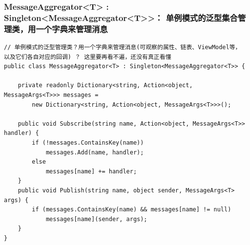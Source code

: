 \documentclass[9pt, b5paper]{article}
\begin{document}
\subsubsection{MessageAggregator<T> : Singleton<MessageAggregator<T>>： 单例模式的泛型集合管理类，用一个字典来管理消息}
\label{sec-6-2-2}
\begin{verbatim}
// 单例模式的泛型管理类？用一个字典来管理消息(可观察的属性、链表、ViewModel等， 以及它们各自对应的回调) ？ 这里要再看不遍，还没有真正看懂
public class MessageAggregator<T> : Singleton<MessageAggregator<T>> {

    private readonly Dictionary<string, Action<object, MessageArgs<T>>> messages =
        new Dictionary<string, Action<object, MessageArgs<T>>>();

    public void Subscribe(string name, Action<object, MessageArgs<T>> handler) {
        if (!messages.ContainsKey(name)) 
            messages.Add(name, handler);
        else 
            messages[name] += handler;
    }
    public void Publish(string name, object sender, MessageArgs<T> args) {
        if (messages.ContainsKey(name) && messages[name] != null) 
            messages[name](sender, args);
    }
}
\end{verbatim}
\end{document}
